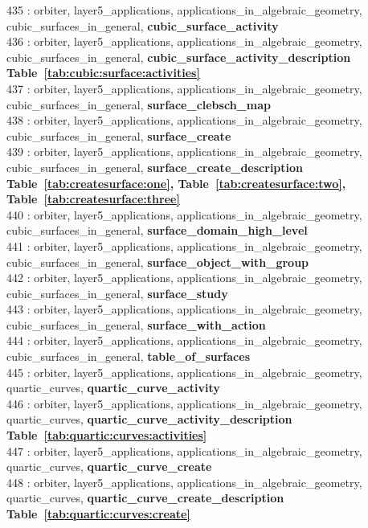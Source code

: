 435 : orbiter, layer5\_applications, applications\_in\_algebraic\_geometry, cubic\_surfaces\_in\_general, {\bf cubic\_surface\_activity}\\
436 : orbiter, layer5\_applications, applications\_in\_algebraic\_geometry, cubic\_surfaces\_in\_general, {\bf cubic\_surface\_activity\_description Table~\ref{tab:cubic:surface:activities}}\\
437 : orbiter, layer5\_applications, applications\_in\_algebraic\_geometry, cubic\_surfaces\_in\_general, {\bf surface\_clebsch\_map}\\
438 : orbiter, layer5\_applications, applications\_in\_algebraic\_geometry, cubic\_surfaces\_in\_general, {\bf surface\_create}\\
439 : orbiter, layer5\_applications, applications\_in\_algebraic\_geometry, cubic\_surfaces\_in\_general, {\bf surface\_create\_description Table~\ref{tab:createsurface:one},  Table~\ref{tab:createsurface:two},  Table~\ref{tab:createsurface:three}}\\
440 : orbiter, layer5\_applications, applications\_in\_algebraic\_geometry, cubic\_surfaces\_in\_general, {\bf surface\_domain\_high\_level}\\
441 : orbiter, layer5\_applications, applications\_in\_algebraic\_geometry, cubic\_surfaces\_in\_general, {\bf surface\_object\_with\_group}\\
442 : orbiter, layer5\_applications, applications\_in\_algebraic\_geometry, cubic\_surfaces\_in\_general, {\bf surface\_study}\\
443 : orbiter, layer5\_applications, applications\_in\_algebraic\_geometry, cubic\_surfaces\_in\_general, {\bf surface\_with\_action}\\
444 : orbiter, layer5\_applications, applications\_in\_algebraic\_geometry, cubic\_surfaces\_in\_general, {\bf table\_of\_surfaces}\\
445 : orbiter, layer5\_applications, applications\_in\_algebraic\_geometry, quartic\_curves, {\bf quartic\_curve\_activity}\\
446 : orbiter, layer5\_applications, applications\_in\_algebraic\_geometry, quartic\_curves, {\bf quartic\_curve\_activity\_description Table~\ref{tab:quartic:curves:activities}}\\
447 : orbiter, layer5\_applications, applications\_in\_algebraic\_geometry, quartic\_curves, {\bf quartic\_curve\_create}\\
448 : orbiter, layer5\_applications, applications\_in\_algebraic\_geometry, quartic\_curves, {\bf quartic\_curve\_create\_description Table~\ref{tab:quartic:curves:create}}\\
